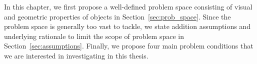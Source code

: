 In this chapter, we first propose a well-defined problem space consisting of visual and geometric properties of objects in Section~\ref{sec:prob_space}. Since the problem space is generally too vast to tackle, we state addition assumptions and underlying rationale to limit the scope of problem space in Section~\ref{sec:assumptions}. Finally, we propose four main problem conditions that we are interested in investigating in this thesis.



